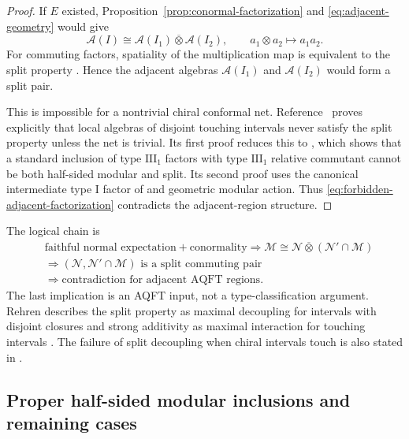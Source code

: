 \documentclass[a4paper,11pt]{article}
\theoremstyle{definition}
\begin{document}
\begin{proof}
If $E$ existed, Proposition~\ref{prop:conormal-factorization} and
\eqref{eq:adjacent-geometry} would give
\begin{equation}\label{eq:forbidden-adjacent-factorization}
 \mathcal A(I)\cong
 \mathcal A(I_1)\overline\otimes\mathcal A(I_2),
 \qquad a_1\otimes a_2\longmapsto a_1a_2.
\end{equation}
For commuting factors, spatiality of the multiplication map is equivalent to
the split property \cite{DoplicherLongo1984}.  Hence the adjacent algebras
$\mathcal A(I_1)$ and $\mathcal A(I_2)$ would form a split pair.

This is impossible for a nontrivial chiral conformal net.
Reference~\cite[Proposition~1.6.12]{GiorgettiThesis} proves explicitly that
local algebras of disjoint touching intervals never satisfy the split property
unless the net is trivial.  Its first proof reduces this to
\cite[Lemma~13]{Wiesbrock1993}, which shows that a standard inclusion of type
$\mathrm{III}_1$ factors with type $\mathrm{III}_1$ relative commutant cannot
be both half-sided modular and split.  Its second proof uses the canonical
intermediate type I factor of
\cite[Theorems~2.1 and 4.1]{DoplicherLongo1984} and geometric modular action.
Thus \eqref{eq:forbidden-adjacent-factorization} contradicts the
adjacent-region structure.
\end{proof}

The logical chain is
\begin{equation}
\begin{split}
 &\text{faithful normal expectation}+\text{conormality}
 \Longrightarrow
 \mathcal M\cong\mathcal N\overline\otimes
 (\mathcal N'\cap\mathcal M)\\
 &\Longrightarrow
 \text{$(\mathcal N,\mathcal N'\cap\mathcal M)$ is a split commuting pair}\\
 &\Longrightarrow
 \text{contradiction for adjacent AQFT regions}.
\end{split}
\end{equation}
The last implication is an AQFT input, not a type-classification argument.
Rehren describes the split property as maximal decoupling for intervals with
disjoint closures and strong additivity as maximal interaction for touching
intervals \cite{Rehren2015}.  The failure of split decoupling when chiral
intervals touch is also stated in \cite{LongoRehren2004}.

\subsection{Proper half-sided modular inclusions and remaining cases}
\end{document}

